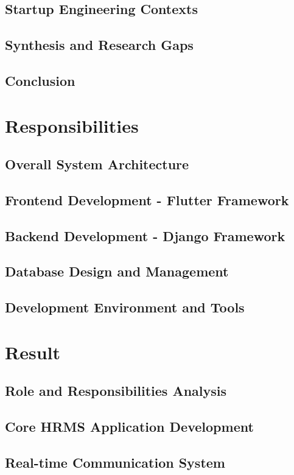 \documentclass[a4paper, 11pt, oneside]{report}
\begin{document}
  \section{Startup Engineering Contexts}
  \section{Synthesis and Research Gaps}
  \section{Conclusion}
  

\chapter{Responsibilities}
  \section{Overall System Architecture}
  \section{Frontend Development - Flutter Framework}
  \section{Backend Development - Django Framework}
  \section{Database Design and Management}
  \section{Development Environment and Tools}
  

\chapter{Result}
  \section{Role and Responsibilities Analysis}
  \section{Core HRMS Application Development}
  \section{Real-time Communication System}
\end{document}
